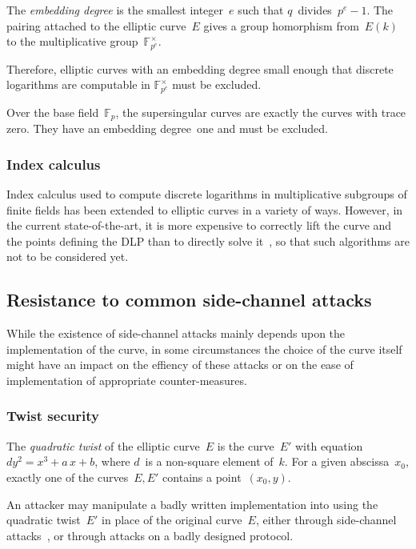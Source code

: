 \documentclass[twocolumn,letterpaper,10pt]{article}
\def\F{\mathbb{F}}
\begin{document}
The \emph{embedding degree} is the smallest integer~$e$ such that
$q$~divides~$p^e -1$.
The pairing attached to the elliptic curve~$E$
gives a group homorphism from~$E(k)$
to the multiplicative group~$\F_{p^e}^{×}$.

Therefore, elliptic curves with an embedding degree small enough
that discrete logarithms are computable in $\F_{p^e}^{×}$
must be excluded.

Over the base field~$\F_p$, the supersingular curves
are exactly the curves with trace zero.
They have an embedding degree~one and must be excluded.

\subsubsection{Index calculus}

Index calculus used to compute discrete logarithms in multiplicative subgroups
of finite fields has been extended to elliptic curves in a variety of ways.
However, in the current state-of-the-art, it is more expensive
to correctly lift the curve and the points defining the DLP than
to directly solve it~\cite{asia1998ss,dcc2000silverman,dcc2000ksst,ecc2007silverman,sac2008silverman},
so that such algorithms are not to be considered yet.

\subsection{Resistance to common side-channel attacks}
\label{ss:side}

While the existence of side-channel attacks
mainly depends upon the implementation of the curve,
in some circumstances the choice of the curve itself
might have an impact on the effiency of these attacks
or on the ease of implementation of appropriate counter-measures.

\subsubsection{Twist security}
\label{sss:twist}

The \emph{quadratic twist} of the elliptic curve~$E$
is the curve~$E'$ with equation~$d y^2 = x^3 + a\,x + b$,
where $d$~is a non-square element of~$k$.
For a given abscissa~$x_0$,
exactly one of the curves~$E, E'$ contains a point~$(x_0, y)$.

An attacker may manipulate a badly written implementation
into using the quadratic twist~$E'$
in place of the original curve~$E$,
either through side-channel attacks~\cite{fdtc2008flrv},
or through attacks on a badly designed protocol.
\end{document}
